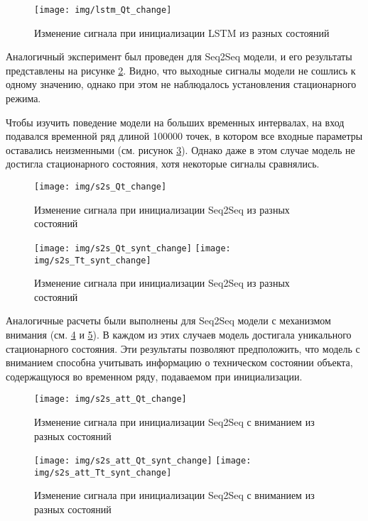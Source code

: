 \documentclass[12pt,a4paper]{article}
\begin{document}
\begin{figure}[htbp]
	\centering\texttt{[image: img/lstm\_Qt\_change]}
	\caption{Изменение сигнала при инициализации LSTM из разных состояний}
	\label{fig:lstm_Qt_change}
\end{figure}

Аналогичный эксперимент был проведен для Seq2Seq модели, и его результаты представлены на рисунке \ref{fig:s2s_Qt_change}. Видно, что выходные сигналы модели не сошлись к одному значению, однако при этом не наблюдалось установления стационарного режима.

Чтобы изучить поведение модели на больших временных интервалах, на вход подавался временной ряд длиной 100000 точек, в котором все входные параметры оставались неизменными (см. рисунок \ref{fig:s2s_Qt_Tt_synt_change}). Однако даже в этом случае модель не достигла стационарного состояния, хотя некоторые сигналы сравнялись.



\begin{figure}[htbp]
	\centering\texttt{[image: img/s2s\_Qt\_change]}
	\caption{Изменение сигнала при инициализации Seq2Seq из разных состояний}
	\label{fig:s2s_Qt_change}
\end{figure}

\begin{figure}[htbp]
	\centering\texttt{[image: img/s2s\_Qt\_synt\_change]}
	\centering\texttt{[image: img/s2s\_Tt\_synt\_change]}
	\caption{Изменение сигнала при инициализации Seq2Seq из разных состояний}
	\label{fig:s2s_Qt_Tt_synt_change}
\end{figure}

Аналогичные расчеты были выполнены для Seq2Seq модели с механизмом внимания (см. \ref{fig:s2s_att_Qt_change} и \ref{fig:s2s_att_Qt_Tt_synt_change}). В каждом из этих случаев модель достигала уникального стационарного состояния. Эти результаты позволяют предположить, что модель с вниманием способна учитывать информацию о техническом состоянии объекта, содержащуюся во временном ряду, подаваемом при инициализации.


\begin{figure}[htbp]
	\centering\texttt{[image: img/s2s\_att\_Qt\_change]}
	\caption{Изменение сигнала при инициализации Seq2Seq с вниманием из разных состояний}
	\label{fig:s2s_att_Qt_change}
\end{figure}

\begin{figure}[htbp]
	\centering\texttt{[image: img/s2s\_att\_Qt\_synt\_change]}
	\centering\texttt{[image: img/s2s\_att\_Tt\_synt\_change]}
	\caption{Изменение сигнала при инициализации Seq2Seq с вниманием из разных состояний}
	\label{fig:s2s_att_Qt_Tt_synt_change}
\end{figure}
\end{document}
